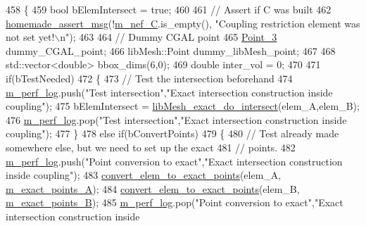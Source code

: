 \begin{DoxyCode}
458 \{
459     \textcolor{keywordtype}{bool} bElemIntersect = \textcolor{keyword}{true};
460 
461     \textcolor{comment}{// Assert if C was built}
462     \hyperlink{common__header_8h_a593ccc80b790b2268653fcf6597bf451}{homemade\_assert\_msg}(!\hyperlink{classcarl_1_1_intersection___tools_adf2892a8902442fbfebb913e9a4fb8ac}{m\_nef\_C}.is\_empty(), \textcolor{stringliteral}{"Coupling restriction element was
       not set yet!\(\backslash\)n"});
463 
464     \textcolor{comment}{// Dummy CGAL point}
465     \hyperlink{_c_g_a_l__typedefs_8h_a9dc49a828e77bbd58c1f5db13edde547}{Point\_3}      dummy\_CGAL\_point;
466     libMesh::Point dummy\_libMesh\_point;
467 
468     std::vector<double> bbox\_dims(6,0);
469     \textcolor{keywordtype}{double} inter\_vol = 0;
470 
471     \textcolor{keywordflow}{if}(bTestNeeded)
472     \{
473         \textcolor{comment}{// Test the intersection beforehand}
474         \hyperlink{classcarl_1_1_intersection___tools_afe18e6ca5fd12bae08efb98f69c71a48}{m\_perf\_log}.push(\textcolor{stringliteral}{"Test intersection"},\textcolor{stringliteral}{"Exact intersection construction inside coupling"});
475         bElemIntersect = \hyperlink{classcarl_1_1_intersection___tools_ae7b16748a45a0579bafecb48ef2fc4ce}{libMesh\_exact\_do\_intersect}(elem\_A,elem\_B);
476         \hyperlink{classcarl_1_1_intersection___tools_afe18e6ca5fd12bae08efb98f69c71a48}{m\_perf\_log}.pop(\textcolor{stringliteral}{"Test intersection"},\textcolor{stringliteral}{"Exact intersection construction inside coupling"});
477     \}
478     \textcolor{keywordflow}{else} \textcolor{keywordflow}{if}(bConvertPoints)
479     \{
480         \textcolor{comment}{// Test already made somewhere else, but we need to set up the exact}
481         \textcolor{comment}{// points.}
482         \hyperlink{classcarl_1_1_intersection___tools_afe18e6ca5fd12bae08efb98f69c71a48}{m\_perf\_log}.push(\textcolor{stringliteral}{"Point conversion to exact"},\textcolor{stringliteral}{"Exact intersection construction inside
       coupling"});
483         \hyperlink{classcarl_1_1_intersection___tools_a1d6303ff6ffc19b6df42626e29a507ce}{convert\_elem\_to\_exact\_points}(elem\_A,
      \hyperlink{classcarl_1_1_intersection___tools_ad636117b292272044b252be62124eb0a}{m\_exact\_points\_A});
484         \hyperlink{classcarl_1_1_intersection___tools_a1d6303ff6ffc19b6df42626e29a507ce}{convert\_elem\_to\_exact\_points}(elem\_B,
      \hyperlink{classcarl_1_1_intersection___tools_a2c3b6211dd1f9b0aa5f2ac8ffc383182}{m\_exact\_points\_B});
485         \hyperlink{classcarl_1_1_intersection___tools_afe18e6ca5fd12bae08efb98f69c71a48}{m\_perf\_log}.pop(\textcolor{stringliteral}{"Point conversion to exact"},\textcolor{stringliteral}{"Exact intersection construction inside
}
\end{DoxyCode}
